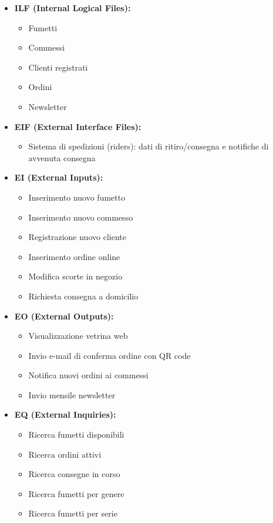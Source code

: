 \documentclass[12pt, a4paper]{article}
\begin{document}
\begin{itemize}
  \item \textbf{ILF (Internal Logical Files):}  
    \begin{itemize}
      \item Fumetti
      \item Commessi 
      \item Clienti registrati 
      \item Ordini
      \item Newsletter
    \end{itemize}

  \item \textbf{EIF (External Interface Files):}  
    \begin{itemize}
      \item Sistema di spedizioni (riders): dati di ritiro/consegna e notifiche di avvenuta consegna  
    \end{itemize}

  \item \textbf{EI (External Inputs):}  
    \begin{itemize}
      \item Inserimento nuovo fumetto  
      \item Inserimento nuovo commesso 
      \item Registrazione nuovo cliente 
      \item Inserimento ordine online   
      \item Modifica scorte in negozio
      \item Richiesta consegna a domicilio 
    \end{itemize}

  \item \textbf{EO (External Outputs):}  
    \begin{itemize}
      \item Visualizzazione vetrina web
      \item Invio e-mail di conferma ordine con QR code  
      \item Notifica nuovi ordini ai commessi 
      \item Invio mensile newsletter
    \end{itemize}
  \item \textbf{EQ (External Inquiries):}  
    \begin{itemize}
      \item Ricerca fumetti disponibili
      \item Ricerca ordini attivi
      \item Ricerca consegne in corso
      \item Ricerca fumetti per genere     
      \item Ricerca fumetti per serie 
    \end{itemize}
\end{itemize}
\end{document}
